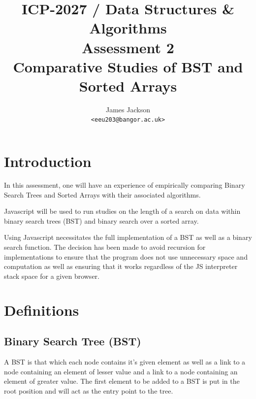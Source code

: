 \documentclass[pdftex,a4paper,10pt,titlepage]{article}
\begin{document}
\title{\textbf{ICP-2027 / Data Structures \& Algorithms} \\ Assessment 2\\ Comparative Studies of BST and Sorted Arrays}
\author{
James Jackson \\ \texttt{<eeu203@bangor.ac.uk>}
}
\maketitle




\pagebreak




\pagestyle{fancy}
\fancyhf{}
\cfoot{\thepage}

\tableofcontents

\pagebreak

\section{Introduction}
In this assessment, one will have an experience of empirically comparing Binary Search Trees and
Sorted Arrays with their associated algorithms.

Javascript will be used to run studies on the length of a search on data within binary search trees (BST) and binary search over a sorted array.

Using Javascript necessitates the full implementation of a BST as well as a binary search function. The decision has been made to avoid recursion for implementations to ensure that the program does not use unnecessary space and computation as well as ensuring that it works regardless of the JS interpreter stack space for a given browser. 

\section{Definitions}

\subsection{Binary Search Tree (BST)}
A BST is that which each node contains it’s given element as well as a link to a node containing an element of lesser value and a link to a node containing an element of greater value. The first element to be added to a BST is put in the root position and will act as the entry point to the tree. 
\end{document}
